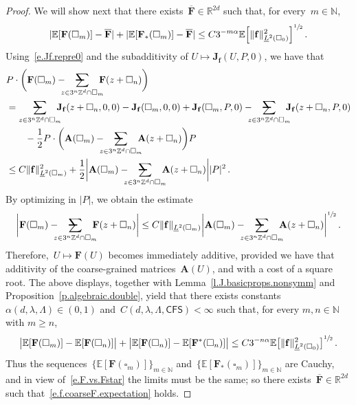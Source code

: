 \documentclass[11pt]{article} %
\makeatletter
\let\oldsquare\square %
\renewcommand{\square}{\oldsquare}
\numberwithin{equation}{section}
\theoremstyle{definition}
\newcommand*{\N}{\ensuremath{\mathbb{N}}}
\newcommand*{\Z}{\ensuremath{\mathbb{Z}}}
\newcommand*{\R}{\ensuremath{\mathbb{R}}}
\newcommand{\f}{\mathbf{f}}
\newcommand{\cu}{\square}
\newcommand{\E}{\mathbb{E}}
\newcommand{\avsum}{\mathop{\mathpalette\avsuminner\relax}\displaylimits}
\newcommand\avsuminner[2]{%
  {\sbox0{$\m@th#1\sum$}%
   \vphantom{\usebox0}%
   \ooalign{%
     \hidewidth
     \smash{\,\rule[.23em]{8.8pt}{1.1pt} \relax}%
     \hidewidth\cr
     $\m@th#1\sum$\cr
   }%
  }%
}
\newcommand{\CFS}{\mathsf{CFS}}
\newcommand{\bfA}{\mathbf{A}}
\newcommand{\bfJ}{\mathbf{J}}
\newcommand{\bfF}{\mathbf{F}}
\makeatother
\begin{document}
\begin{proof}
We will show next that there exists~$\overline{\bfF}\in\R^{2d}$ such that, for every~$m\in\N$,
\begin{equation} \label{e.f.coarseF.expectation}
| \E[\bfF(\cu_m)] -  \overline{\bfF}|
+
|  \E[ \bfF_*(\cu_m)] - \overline{\bfF} |   
\leq 
C 3^{-m \alpha}  \E\Bigl[ \| \f \|_{\underline{L}^2(\cu_0)}^2 \Bigr]^{\sfrac12} 
\,.
\end{equation}
Using~\eqref{e.Jf.repre0} and the subadditivity of $U \mapsto \bfJ_\f(U, P,0)$, we have that 
\begin{align*}  
\lefteqn{
 P\cdot \biggl(  \bfF(\cu_m) - \!\!\!\! \avsum_{z \in 3^n \Z^d \cap \cu_m} \!\!\!\! \bfF(z+\cu_n)  \biggr) 
} & \qquad \\ 
& = \avsum_{z \in 3^n \Z^d \cap \cu_m} \!\!\!\! \bfJ_\f(z+\cu_n, 0,0)  - \bfJ_\f(\cu_m, 0,0) 
+  \bfJ_\f(\cu_m, P,0)  - \!\!\!\! \avsum_{z \in 3^n \Z^d \cap \cu_m} \!\!\!\! \bfJ_\f(z+\cu_n, P,0) 
\\ & \qquad 
- \frac{1}{2} P \cdot \biggl(  \bfA(\cu_m) - \!\!\!\! \avsum_{z \in 3^n \Z^d \cap \cu_m} \!\!\!\! \bfA(z+\cu_n)  \biggr) P
\\ &
\leq
C \| \f \|_{\underline{L}^2(\cu_m)}^2  +  \frac12 \biggl|  \bfA(\cu_m) - \!\!\!\! \avsum_{z \in 3^n \Z^d \cap \cu_m} \!\!\!\! \bfA(z+\cu_n)  \biggr| |P|^2 \,.
\end{align*}
By optimizing in $|P|$, we obtain the estimate
\begin{equation}  
\label{e.f.coarseF.additive}
\bigg|  \bfF(\cu_m) - \!\!\!\! \avsum_{z \in 3^n \Z^d \cap \cu_m} \!\!\!\!  \bfF(z+\cu_n)   \bigg| 
\leq 
C \| \f \|_{\underline{L}^2(\cu_m)} \biggl|  \bfA(\cu_m) - \!\!\!\! \avsum_{z \in 3^n \Z^d \cap \cu_m} \!\!\!\! \bfA(z+\cu_n)  \biggr| ^{\sfrac12}
\,.
\end{equation}
Therefore,~$U \mapsto \bfF(U)$ becomes immediately additive, provided we have that additivity of the coarse-grained matrices~$\bfA(U)$, and with a cost of a square root. The above displays, together with Lemma~\ref{l.J.basicprops.nonsymm} and Proposition~\ref{p.algebraic.double}, 
yield  that there exists constants~$\alpha(d,\lambda,\Lambda) \in (0,1)$ and~$C(d,\lambda,\Lambda,\CFS) < \infty$ such that, for every $m,n \in \N$ with $m \geq n$, 
\begin{align}  \label{e.bF.diffexp}
\bigl| \E[\bfF(\cu_m)] -   \E[\bfF(\cu_n)] \bigr|  
+ 
\bigl| \E[\bfF(\cu_n)] -   \E[\bfF^*(\cu_n)] \bigr|  
\leq 
C 3^{-n \alpha}  \E\bigl[ \| \f \|_{\underline{L}^2(\cu_0)}^2 \bigr]^{\sfrac12} 
\,.
\end{align}
Thus the sequences~$\{ \E [ \bfF(\cu_m)]\}_{m\in\N}$ and~$\{ \E [ \bfF_*(\cu_m)]\}_{m\in\N}$ are Cauchy, and in view of~\eqref{e.F.vs.Fstar} the limits must be the same; so there exists~$\overline{\bfF} \in \R^{2d}$ such that~\eqref{e.f.coarseF.expectation} holds.


\end{proof}
\end{document}
